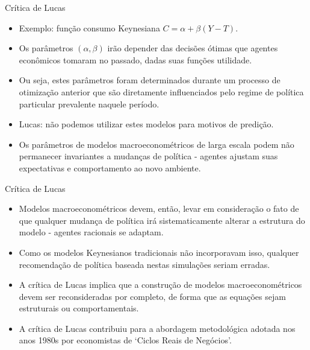 \documentclass[10pt]{beamer}
\begin{document}
\begin{frame}{Crítica de Lucas}
    \begin{itemize}
        \item Exemplo: função consumo Keynesiana $C = \alpha + \beta(Y-T)$.
        \bigskip
        \item Os parâmetros $(\alpha, \beta)$ irão depender das decisões ótimas que agentes econômicos tomaram no passado, dadas suas funções utilidade.
        \bigskip
        \item Ou seja, estes parâmetros foram determinados durante um processo de otimização anterior que são diretamente influenciados pelo regime de política particular prevalente naquele período.
        \bigskip
        \item Lucas: não podemos utilizar estes modelos para motivos de predição.
        \bigskip
        \item Os parâmetros de modelos macroeconométricos de larga escala podem não permanecer invariantes a mudanças de política - agentes ajustam suas expectativas e comportamento ao novo ambiente.
    \end{itemize}
\end{frame}

\begin{frame}{Crítica de Lucas}
    \begin{itemize}
        \item Modelos macroeconométricos devem, então, levar em consideração o fato de que qualquer mudança de política irá sistematicamente alterar a estrutura do modelo - agentes racionais se adaptam.
        \bigskip
        \item Como os modelos Keynesianos tradicionais não incorporavam isso, qualquer recomendação de política baseada nestas simulações seriam erradas.
        \bigskip
        \item A crítica de Lucas implica que a construção de modelos macroeconométricos devem ser reconsideradas por completo, de forma que as equações sejam estruturais ou comportamentais.
        \bigskip
        \item A crítica de Lucas contribuiu para a abordagem metodológica adotada nos anos 1980s por economistas de `Ciclos Reais de Negócios'.
    \end{itemize}
\end{frame}
\end{document}
